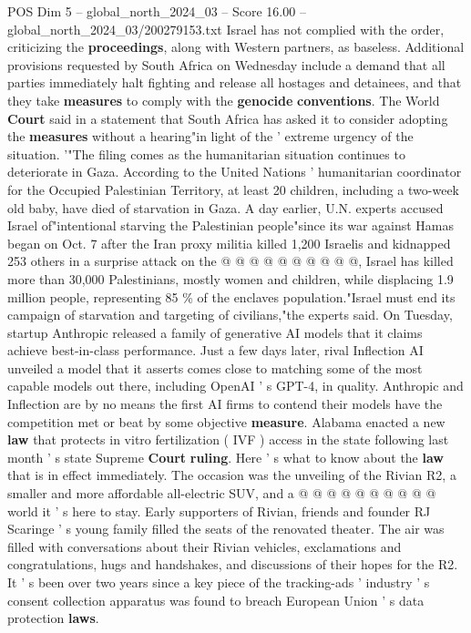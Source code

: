 \begin{textsample}{POS Dim 5 – global\_north\_2024\_03 – Score 16.00 – global\_north\_2024\_03/200279153.txt}
Israel has not complied with the order, criticizing the \textbf{proceedings}, along with Western partners, as baseless.
Additional provisions requested by South Africa on Wednesday include a demand that all parties immediately halt fighting and release all hostages and detainees, and that they take \textbf{measures} to comply with the \textbf{genocide} \textbf{conventions}.
The World \textbf{Court} said in a statement that South Africa has asked it to consider adopting the \textbf{measures} without a hearing"in light of the ' extreme urgency of the situation. '"The filing comes as the humanitarian situation continues to deteriorate in Gaza.
According to the United Nations ' humanitarian coordinator for the Occupied Palestinian Territory, at least 20 children, including a two-week old baby, have died of starvation in Gaza.
A day earlier, U.N. experts accused Israel of"intentional starving the Palestinian people"since its war against Hamas began on Oct. 7 after the Iran proxy militia killed 1,200 Israelis and kidnapped 253 others in a surprise attack on the @ @ @ @ @ @ @ @ @ @, Israel has killed more than 30,000 Palestinians, mostly women and children, while displacing 1.9 million people, representing 85 \% of the enclaves population."Israel must end its campaign of starvation and targeting of civilians,"the experts said.
On Tuesday, startup Anthropic released a family of generative AI models that it claims achieve best-in-class performance.
Just a few days later, rival Inflection AI unveiled a model that it asserts comes close to matching some of the most capable models out there, including OpenAI ' s GPT-4, in quality.
Anthropic and Inflection are by no means the first AI firms to contend their models have the competition met or beat by some objective \textbf{measure}.
Alabama enacted a new \textbf{law} that protects in vitro fertilization ( IVF ) access in the state following last month ' s state Supreme \textbf{Court} \textbf{ruling}.
Here ' s what to know about the \textbf{law} that is in effect immediately.
The occasion was the unveiling of the Rivian R2, a smaller and more affordable all-electric SUV, and a @ @ @ @ @ @ @ @ @ @ world it ' s here to stay.
Early supporters of Rivian, friends and founder RJ Scaringe ' s young family filled the seats of the renovated theater.
The air was filled with conversations about their Rivian vehicles, exclamations and congratulations, hugs and handshakes, and discussions of their hopes for the R2.
It ' s been over two years since a key piece of the tracking-ads ' industry ' s consent collection apparatus was found to breach European Union ' s data protection \textbf{laws}.

\end{textsample}
